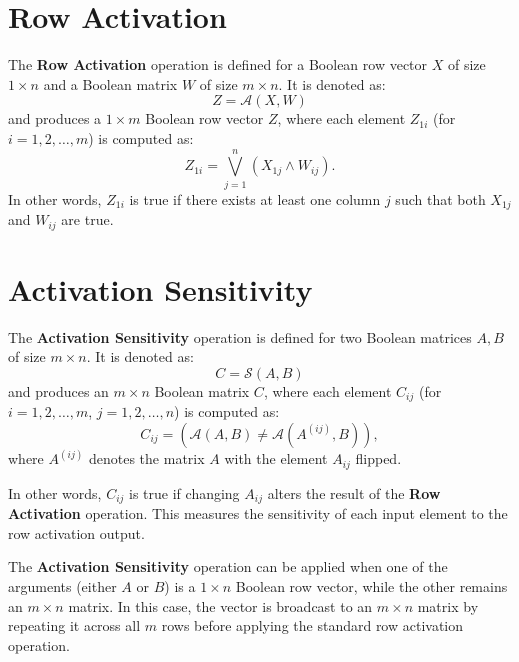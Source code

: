 \documentclass{article}
\begin{document}
\section{Row Activation}
The \textbf{Row Activation} operation is defined for a Boolean row vector \( X \) of size \( 1 \times n \) and a Boolean matrix \( W \) of size \( m \times n \). It is denoted as:
\[
Z = \mathcal{A}(X, W)
\]
and produces a \( 1 \times m \) Boolean row vector \( Z \), where each element \( Z_{1i} \) (for \( i = 1, 2, \dots, m \)) is computed as:  
\[
Z_{1i} = \bigvee_{j=1}^{n} \left( X_{1j} \wedge W_{ij} \right).
\]
In other words, \( Z_{1i} \) is true if there exists at least one column \( j \) such that both \( X_{1j} \) and \( W_{ij} \) are true.
\section*{Activation Sensitivity}
The \textbf{Activation Sensitivity} operation is defined for two Boolean matrices \( A, B \) of size \( m \times n \). It is denoted as:
\[
C = \mathcal{S}(A, B)
\]
and produces an \( m \times n \) Boolean matrix \( C \), where each element \( C_{ij} \) (for \( i = 1, 2, \dots, m \), \( j = 1, 2, \dots, n \)) is computed as:  
\[
C_{ij} = \left( \mathcal{A}(A, B) \neq \mathcal{A}(A^{(ij)}, B) \right),
\]
where \( A^{(ij)} \) denotes the matrix \( A \) with the element \( A_{ij} \) flipped.

In other words, \( C_{ij} \) is true if changing \( A_{ij} \) alters the result of the \textbf{Row Activation} operation. This measures the sensitivity of each input element to the row activation output.

The \textbf{Activation Sensitivity} operation can be applied when one of the arguments (either \( A \) or \( B \)) is a \( 1 \times n \) Boolean row vector, while the other remains an \( m \times n \) matrix. In this case, the vector is broadcast to an \( m \times n \) matrix by repeating it across all \( m \) rows before applying the standard row activation operation.
\end{document}
